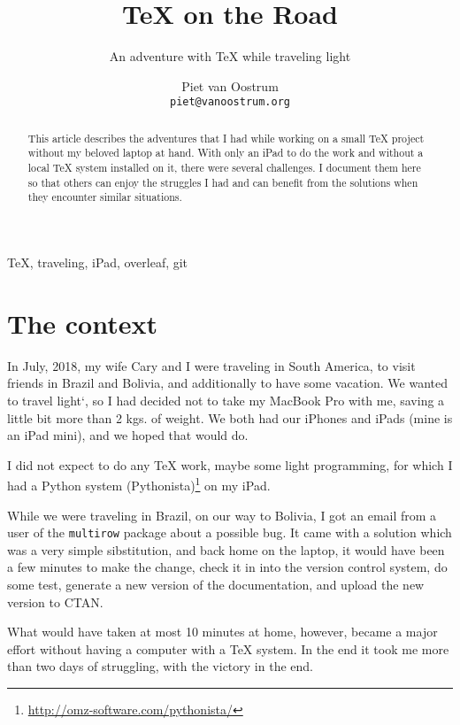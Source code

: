 \documentclass[nosubsub]{maps}
\begin{document}
\title{\TeX{} on the Road}

\subtitle{An adventure with \TeX{} while traveling light}

\author{%
  Piet van Oostrum\\
  \texttt{piet@vanoostrum.org}}

\maketitle

\begin{abstract}
This article describes the adventures that I had while working on a small \TeX{} project without my beloved laptop at hand. With only an iPad to do the work and without a local \TeX{} system installed on it, there were several challenges. I document them here so that others can enjoy the struggles I had and can benefit from the solutions when they encounter similar situations.
\end{abstract}

\begin{keywords}\TeX, traveling, iPad, overleaf, git
\end{keywords}

\section{The context}

In July, 2018, my wife Cary and I were traveling in South America, to visit friends in Brazil and Bolivia, and additionally to have some vacation. We wanted to travel light`, so I had decided not to take my MacBook Pro with me, saving a little bit more than 2 kgs. of weight. We both had our iPhones and iPads (mine is an iPad mini), and we hoped that would do.

I did not expect to do any \TeX{} work, maybe some light programming, for which I had a Python system (Pythonista)\footnote{\url{http://omz-software.com/pythonista/}} on my iPad.

While we were traveling in Brazil, on our way to Bolivia, I got an email from a user of the \texttt{multirow} package about a possible bug. It came with a solution which was a very simple sibstitution, and back home on the laptop, it would have been a few minutes to make the change, check it in into the version control system, do some test, generate a new version of the documentation, and upload the new version to CTAN.

What would have taken at most 10 minutes at home, however, became a major effort without having a computer with a \TeX{} system. In the end it took me more than two days of struggling, with the victory in the end.
\end{document}
